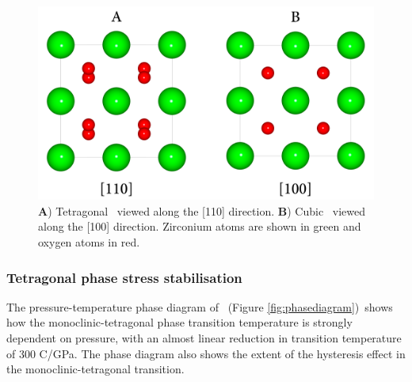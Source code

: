 \begin{figure}[ht]
\centering
\includegraphics[width=14cm]{images/tet_vs_cubic.png}
\caption{\textbf{A}) Tetragonal \zirconia\ viewed along the [110] direction. \textbf{B}) Cubic \zirconia\ viewed along the [100] direction. Zirconium atoms are shown in green and oxygen atoms in red.}
\label{figure:tetvscubic}
\end{figure}

\subsubsection{Tetragonal phase stress stabilisation} \label{section:tet_stress_stabilisation}

The pressure-temperature phase diagram of \zirconia\ (Figure \ref{fig:phasediagram})\footnotemark\ shows how the monoclinic-tetragonal phase transition temperature is strongly dependent on pressure, with an almost linear reduction in transition temperature of 300 \textdegree C/GPa. The phase diagram also shows the extent of the hysteresis effect in the monoclinic-tetragonal transition. 


%

